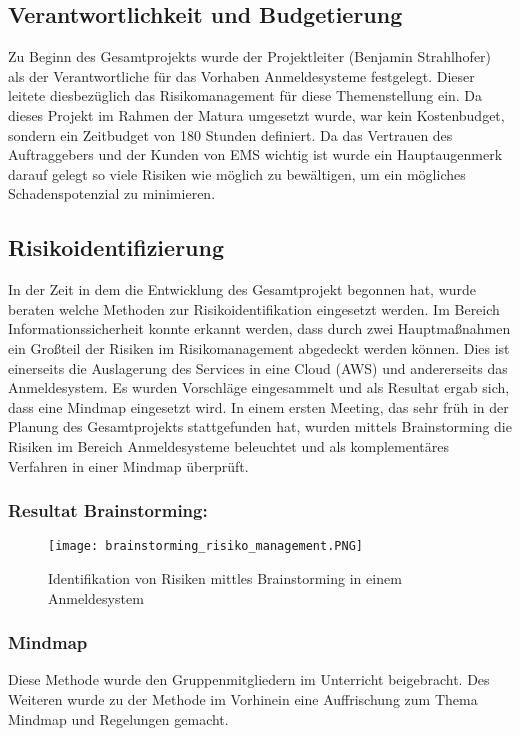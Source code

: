 \subsection{Verantwortlichkeit und Budgetierung}
Zu Beginn des Gesamtprojekts wurde der Projektleiter (Benjamin Strahlhofer) als der Verantwortliche für das Vorhaben Anmeldesysteme festgelegt. Dieser leitete diesbezüglich das Risikomanagement für diese Themenstellung ein.
Da dieses Projekt im Rahmen der Matura umgesetzt wurde, war kein Kostenbudget, sondern ein Zeitbudget von 180 Stunden definiert. Da das Vertrauen des Auftraggebers und der Kunden von EMS wichtig ist wurde ein Hauptaugenmerk darauf gelegt so viele Risiken wie möglich zu bewältigen, um ein mögliches Schadenspotenzial zu minimieren.

\subsection{Risikoidentifizierung}
In der Zeit in dem die Entwicklung des Gesamtprojekt begonnen hat, wurde beraten welche Methoden zur Risikoidentifikation eingesetzt werden. Im Bereich Informationssicherheit konnte erkannt werden, dass durch zwei Hauptmaßnahmen ein Großteil der Risiken im Risikomanagement abgedeckt werden können. Dies ist einerseits die Auslagerung des Services in eine Cloud (AWS) und andererseits das Anmeldesystem. Es wurden Vorschläge eingesammelt und als Resultat ergab sich, dass eine Mindmap eingesetzt wird.
In einem ersten Meeting, das sehr früh in der Planung des Gesamtprojekts stattgefunden hat, wurden mittels Brainstorming die Risiken im Bereich Anmeldesysteme beleuchtet und als komplementäres Verfahren in einer Mindmap überprüft.

\subsubsection{Resultat Brainstorming:}
\begin{center}
\begin{figure}[H]
    \centering
    \texttt{[image: brainstorming\_risiko\_management.PNG]}
    \caption{Identifikation von Risiken mittles Brainstorming in einem Anmeldesystem}
\end{figure}
\end{center}

\newpage
\subsubsection{Mindmap}
Diese Methode wurde den Gruppenmitgliedern im Unterricht beigebracht. Des Weiteren wurde zu der Methode im Vorhinein eine Auffrischung zum Thema Mindmap und Regelungen gemacht.

